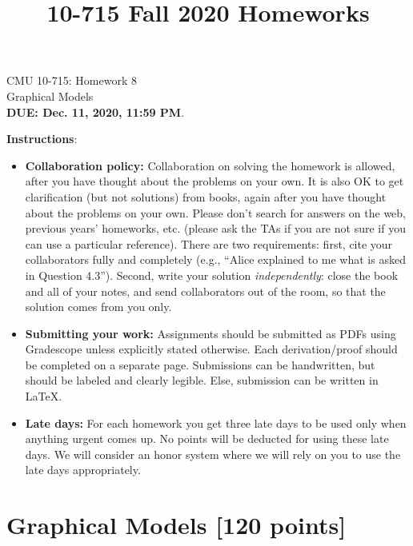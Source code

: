 \documentclass{article}
\title{10-715 Fall 2020 Homeworks}
\begin{document}

\begin{center}
{\Large CMU 10-715: Homework 8}\\
Graphical Models \\
{\bf DUE: Dec. 11, 2020, 11:59 PM}.\\
\end{center}


\textbf{\large Instructions}:
\begin{itemize}
    \item \textbf{Collaboration policy:} Collaboration on solving the homework is allowed, after you have thought about the problems on your own. It is also OK to get clarification (but not solutions) from books, again after you have thought about the problems on your own. Please don’t search for answers on the web, previous years’ homeworks, etc. (please ask the TAs if you are not sure if you can use a particular reference). There are two requirements: first, cite your collaborators fully and completely (e.g., ``Alice explained to me what is asked in Question 4.3''). Second, write your solution \emph{independently}: close the book and all of your notes, and send collaborators out of the room, so that the solution comes from you only. 
    \item \textbf{Submitting your work:} Assignments should be submitted as PDFs using Gradescope unless explicitly stated otherwise. Each derivation/proof should be completed on a separate page. Submissions can be handwritten, but should be labeled and clearly legible. Else, submission can be written in LaTeX.
    
    \item \textbf{Late days:} For each homework you get three late days to be used only when anything urgent comes up. No points will be deducted for using these late days. We will consider an honor system where we will rely on you to use the late days appropriately.
    

\end{itemize}

\newpage
\section{Graphical Models [120 points]}
\end{document}
